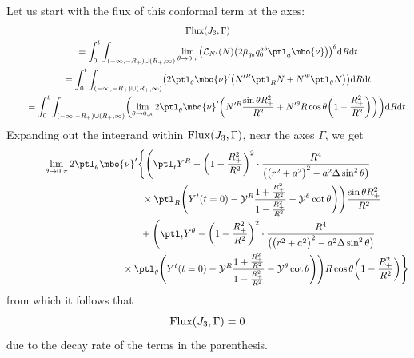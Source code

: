 Let us start with the flux of this conformal term at the axes:
\begin{gather*}
 {\rm Flux} (J_3, \Gamma) \\
 \qquad{} = \int^t_0 \int_{(-\infty, -R_+) \cup (R_+, \infty)} \lim_{\theta \to 0, \pi} \bigl(\mathcal{L}_{N'} (N) \bigl(2 \bar{\mu}_{q_0}q^{ab}_0 \ptl_a \mbo{\nu}\bigr) \bigr)^\theta {\rm d}R {\rm d}t \notag\\
 \qquad{} = \int^t_0 \int_{(-\infty, -R_+) \cup (R_+, \infty)} \bigl( 2 \ptl_\theta \mbo{\nu}' \bigl(N'^R \ptl_R N + N'^\theta \ptl_\theta N\bigr) \bigr) {\rm d}R {\rm d}t \notag\\
 \qquad{} = \int^t_0 \int_{(-\infty, -R_+) \cup (R_+, \infty)} \biggl(\lim_{\theta \to 0, \pi} 2 \ptl_\theta \mbo{\nu}' \biggl(N'^R \frac{\sin \theta R^2_+}{R^2} + N'^\theta R \cos \theta\biggl(1-\frac{R^2_+}{R^2} \biggr) \biggr)\biggr) {\rm d}R {\rm d}t.
\end{gather*}
Expanding out the integrand within ${\rm Flux} (J_3, \Gamma) $, near the axes $\Gamma$, we get
\begin{gather*}
 \lim_{\theta \to 0, \pi} 2 \ptl_\theta \mbo{\nu}' \Biggl\{ \Biggl(\ptl_t Y^R -\biggl(1 - \frac{R^2_+}{R^2} \biggr)^2 \cdot \frac{R^4}{ \bigl(\bigl(r^2+a^2\bigr)^2 -a^2 \Delta \sin^2 \theta\bigr)} \notag\\
 \hphantom{\lim_{\theta \to 0, \pi} 2 \ptl_\theta \mbo{\nu}' \Biggl\{ \Biggl(}{}
 \times \ptl_R \Biggl(Y^t(t=0) - \mathcal{Y}^R \frac{1+ \frac{R^2_+}{R^2}}{1-\frac{R^2_+}{R^2}} - \mathcal{Y}^\theta \cot \theta \Biggr) \Biggr)\frac{\sin \theta R^2_+}{R^2} \notag\\
\hphantom{ \lim_{\theta \to 0, \pi} 2 \ptl_\theta \mbo{\nu}' \Biggl\{}{} + \Biggl(\ptl_t Y^\theta - \biggl(1- \frac{R^2_+}{R^2}\biggr)^2 \cdot \frac{R^4}{ \bigl(\bigl(r^2+a^2\bigr)^2 -a^2 \Delta
	\sin^2 \theta \bigr)} \notag\\
\hphantom{ \lim_{\theta \to 0, \pi} 2 \ptl_\theta \mbo{\nu}' \Biggl\{ +\Biggl(}{} \times \ptl_\theta \Biggl(Y^t (t=0) - \mathcal{Y}^R \frac{1 + \frac{R^2_+}{R^2}} {{1-\frac{R^2_+}{R^2}} } - \mathcal{Y}^ \theta \cot \theta \Biggr) \Biggr) R \cos \theta \biggl(1-\frac{R^2_+}{R^2}\biggr) \Biggr\}
\end{gather*}
from which it follows that
\[
{\rm Flux} (J_3, \Gamma)= 0
\]
due to the decay rate of the terms in the parenthesis.

